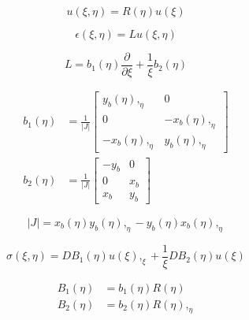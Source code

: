 

\begin{equation}
    u(\xi,\eta) = R(\eta) u(\xi)
    \label{lr_eq:sbfem_disp_interpolation}
\end{equation}

\begin{equation}
    \epsilon(\xi,\eta) = Lu(\xi,\eta)
    \label{lr_eq:sbfem_strain_disp_relation}
\end{equation}

\begin{equation}
    L = b_1(\eta) \frac{\partial}{\partial \xi} +
        \frac{1}{\xi}b_2(\eta)
\end{equation}

\begin{equation}
    \begin{aligned}
    b_1(\eta) & = \frac{1}{|J|}
            \begin{bmatrix}
                y_b(\eta),_{\eta}   &   0   \\
                0   &   -x_b(\eta),_{\eta}  \\
                -x_b(\eta),_{\eta} & y_b(\eta),_{\eta}
            \end{bmatrix} \\
    b_2(\eta) & = \frac{1}{|J|}
            \begin{bmatrix}
                -y_b    &   0   \\
                0       &   x_b \\
                x_b     &   y_b
            \end{bmatrix}
    \end{aligned}
    \label{lr_eq:sbfem_little_b}
\end{equation}

\begin{equation}
    |J| = x_b(\eta)y_b(\eta),_{\eta}
        - y_b(\eta)x_b(\eta),_{\eta}
    \label{lr_eq:sbfem_Jdet}
\end{equation}

\begin{equation}
    \sigma(\xi,\eta) = DB_1(\eta)u(\xi),_{\xi} +
                        \frac{1}{\xi}DB_2(\eta)u(\xi)
    \label{lr_eq:sbfem_stress}
\end{equation}

\begin{equation}
    \begin{aligned}
        B_1(\eta) &= b_1(\eta)R(\eta)    \\
        B_2(\eta) &= b_2(\eta)R(\eta),_{\eta}
        \label{lr_eq:sbfem_captial_b}
    \end{aligned}
\end{equation}


